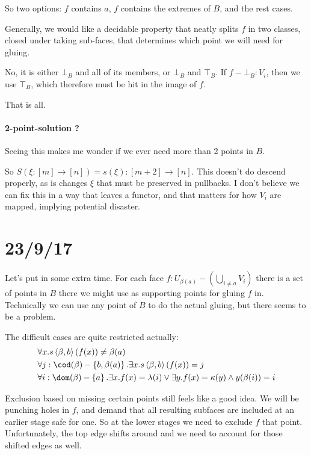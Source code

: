 \documentclass{tac}
\newcommand\set[1]{\left\{#1\right\}}
\newcommand\of{:}
\newcommand\tuplet[1]{\left\langle #1 \right\rangle}
\begin{document}
So two options: $f$ contains $a$, $f$ contains the extremes of $B$, and the rest cases.

Generally, we would like a decidable property that neatly splits $f$ in two classes, closed under taking sub-faces, that determines which point we will need for gluing.

No, it is either $\bot_B$ and all of its members, or $\bot_B$ and $\top_B$. If $f-\bot_B\of V_i$, then we use $\top_B$, which therefore must be hit in the image of $f$.

That is all.

\paragraph{2-point-solution ?}
Seeing this makes me wonder if we ever need more than 2 points in $B$. 

So $S(\xi\of[m]\to[n])  = s(\xi)\of[m + 2]\to [n]$. This doesn't do descend properly, as is changes $\xi$ that must be preserved in pullbacks. I don't believe we can fix this in a way that leaves a functor, and that matters for how $V_i$ are mapped, implying potential disaster.

\section{23/9/17}
Let's put in some extra time. For each face $f\of U_{\beta(a)}-(\bigcup_{i\neq a}V_i)$ there is a set of points in $B$ there we might use as supporting points for gluing $f$ in. Technically we can use any point of $B$ to do the actual gluing, but there seems to be a problem.

The difficult cases are quite restricted actually:
\begin{align*}
&\forall x. s\tuplet{\beta,b}(f(x))\neq \beta(a)\\
&\forall j\of\cod(\beta) - \set{b,\beta(a)}.\exists x.s\tuplet{\beta,b}(f(x)) = j\\
&\forall i\of\dom(\beta) - \set a.\exists x.f(x) = \lambda(i) \vee \exists y.f(x) = \kappa(y) \land y(\beta(i)) = i
\end{align*}

Exclusion based on missing certain points still feels like a good idea. We will be punching holes in $f$, and demand that all resulting subfaces are included at an earlier stage safe for one. So at the lower stages we need to exclude $f$ that point. Unfortunately, the top edge shifts around and we need to account for those shifted edges as well.
\end{document}

